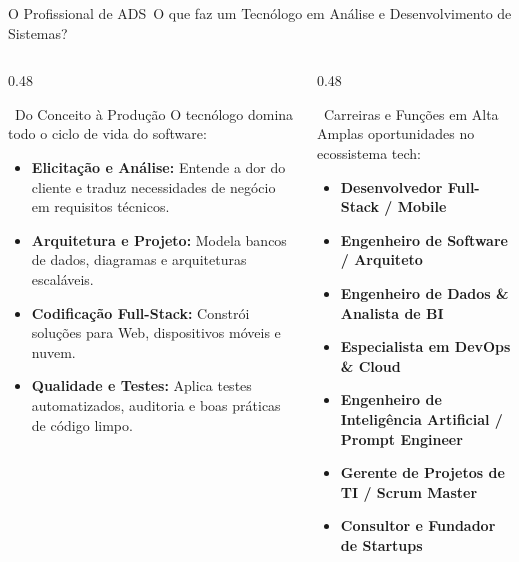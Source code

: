 
\begin{frame}{O Profissional de ADS}{\faUserTie\ O que faz um Tecnólogo em Análise e Desenvolvimento de Sistemas?}
  \begin{columns}[t]
    \begin{column}{0.48\textwidth}
      \begin{moderncard}{\faLaptopCode\ Do Conceito à Produção}
        \scriptsize
        O tecnólogo domina todo o ciclo de vida do software:
        \begin{itemize}\setlength{\itemsep}{0.2em}
          \item \textbf{Elicitação e Análise:} Entende a dor do cliente e traduz necessidades de negócio em requisitos técnicos.
          \item \textbf{Arquitetura e Projeto:} Modela bancos de dados, diagramas e arquiteturas escaláveis.
          \item \textbf{Codificação Full-Stack:} Constrói soluções para Web, dispositivos móveis e nuvem.
          \item \textbf{Qualidade e Testes:} Aplica testes automatizados, auditoria e boas práticas de código limpo.
        \end{itemize}
      \end{moderncard}
    \end{column}
    
    \begin{column}{0.48\textwidth}
      \begin{greencard}{\faBriefcase\ Carreiras e Funções em Alta}
        \scriptsize
        Amplas oportunidades no ecossistema tech:
        \begin{itemize}\setlength{\itemsep}{0.2em}
          \item \textbf{Desenvolvedor Full-Stack / Mobile}
          \item \textbf{Engenheiro de Software / Arquiteto}
          \item \textbf{Engenheiro de Dados \& Analista de BI}
          \item \textbf{Especialista em DevOps \& Cloud}
          \item \textbf{Engenheiro de Inteligência Artificial / Prompt Engineer}
          \item \textbf{Gerente de Projetos de TI / Scrum Master}
          \item \textbf{Consultor e Fundador de Startups}
        \end{itemize}
      \end{greencard}
    \end{column}
  \end{columns}
\end{frame}

